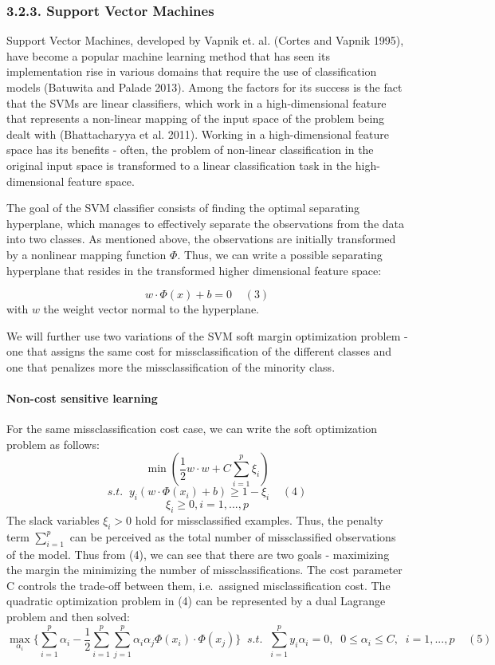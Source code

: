 \documentclass[12pt,]{article}
\let\oldparagraph\paragraph
\renewcommand{\paragraph}[1]{\oldparagraph{#1}\mbox{}}
\begin{document}
\hypertarget{support-vector-machines}{%
\subsubsection{3.2.3. Support Vector
Machines}\label{support-vector-machines}}

Support Vector Machines, developed by Vapnik et. al. (Cortes and Vapnik
1995), have become a popular machine learning method that has seen its
implementation rise in various domains that require the use of
classification models (Batuwita and Palade 2013). Among the factors for
its success is the fact that the SVMs are linear classifiers, which work
in a high-dimensional feature that represents a non-linear mapping of
the input space of the problem being dealt with (Bhattacharyya et al.
2011). Working in a high-dimensional feature space has its benefits -
often, the problem of non-linear classification in the original input
space is transformed to a linear classification task in the
high-dimensional feature space.

The goal of the SVM classifier consists of finding the optimal
separating hyperplane, which manages to effectively separate the
observations from the data into two classes. As mentioned above, the
observations are initially transformed by a nonlinear mapping function
\(\Phi\). Thus, we can write a possible separating hyperplane that
resides in the transformed higher dimensional feature space:

\[w\cdot\Phi(x)+b=0\;\;\;\;(3)\] with \(w\) the weight vector normal to
the hyperplane.

We will further use two variations of the SVM soft margin optimization
problem - one that assigns the same cost for missclassification of the
different classes and one that penalizes more the missclassification of
the minority class.

\hypertarget{non-cost-sensitive-learning}{%
\paragraph{Non-cost sensitive
learning}\label{non-cost-sensitive-learning}}

For the same missclassification cost case, we can write the soft
optimization problem as follows:
\[\min(\frac{1}{2}w \cdot w + C\sum_{i=1}^{p} \xi_i) \]
\[s.t. \;\; y_i(w \cdot \Phi(x_i) + b) \geq 1 - \xi_i\;\;\;\;(4) \]
\[\xi_i \geq 0, i = 1,...,p\] The slack variables \(\xi_i > 0\) hold for
missclassified examples. Thus, the penalty term \(\sum_{i=1}^{p}\) can
be perceived as the total number of missclassified observations of the
model. Thus from (4), we can see that there are two goals - maximizing
the margin the minimizing the number of missclassifications. The cost
parameter C controls the trade-off between them, i.e.~assigned
misclassification cost. The quadratic optimization problem in (4) can be
represented by a dual Lagrange problem and then solved:
\[\max_{\alpha_i} \{ \sum_{i=1}^{p}{\alpha_i} - \frac{1}{2} \sum_{i=1}^{p}\sum_{j=1}^{p}{\alpha_i\alpha_j\Phi(x_i)\cdot\Phi(x_j)} \} \;\; s.t. \;\; \sum_{i=1}^{p}{y_i\alpha_i}=0, \;\; 0 \leq\alpha_i\leq C, \;\; i=1,...,p\;\;\;\;(5) \]
\end{document}
